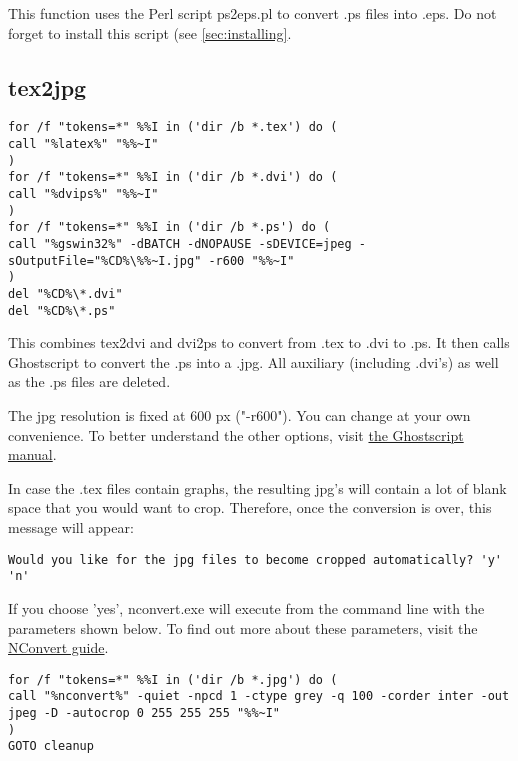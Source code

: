 \documentclass{article}
\begin{document}
This function uses the Perl script ps2eps.pl to convert .ps files into .eps. Do not forget to install this script (see \ref{sec:installing}.
\subsection{tex2jpg}

\begin{mdframed}[style=code]
\begin{lstlisting}[breaklines]
for /f "tokens=*" %%I in ('dir /b *.tex') do (
call "%latex%" "%%~I"
)
for /f "tokens=*" %%I in ('dir /b *.dvi') do (
call "%dvips%" "%%~I"
)
for /f "tokens=*" %%I in ('dir /b *.ps') do (
call "%gswin32%" -dBATCH -dNOPAUSE -sDEVICE=jpeg -sOutputFile="%CD%\%%~I.jpg" -r600 "%%~I"
)
del "%CD%\*.dvi"
del "%CD%\*.ps"
\end{lstlisting}
\end{mdframed}

This combines tex2dvi and dvi2ps to convert from .tex to .dvi to .ps. It then calls Ghostscript to convert the .ps into a .jpg. All auxiliary (including .dvi's) as well as the .ps files are deleted.

The jpg resolution is fixed at 600 px ("-r600"). You can change at your own convenience. To better understand the other options, visit \href{http://www.ghostscript.com/doc/current/Use.htm}{the Ghostscript manual}.

In case the .tex files contain graphs, the resulting jpg's will contain a lot of blank space that you would want to crop. Therefore, once the conversion is over, this message will appear:

\begin{mdframed}[style=code]
\begin{lstlisting}[breaklines]
Would you like for the jpg files to become cropped automatically? 'y' 'n'
\end{lstlisting}
\end{mdframed}

\vspace{0.3cm}

If you choose 'yes', nconvert.exe will execute from the command line with the parameters shown below. To find out more about these parameters, visit the \href{http://www.xnview.com/wiki/index.php/NConvert_User_Guide}{NConvert guide}.

\begin{mdframed}[style=code]
\begin{lstlisting}[breaklines]
for /f "tokens=*" %%I in ('dir /b *.jpg') do (
call "%nconvert%" -quiet -npcd 1 -ctype grey -q 100 -corder inter -out jpeg -D -autocrop 0 255 255 255 "%%~I"
)
GOTO cleanup
\end{lstlisting}
\end{mdframed}
\end{document}

